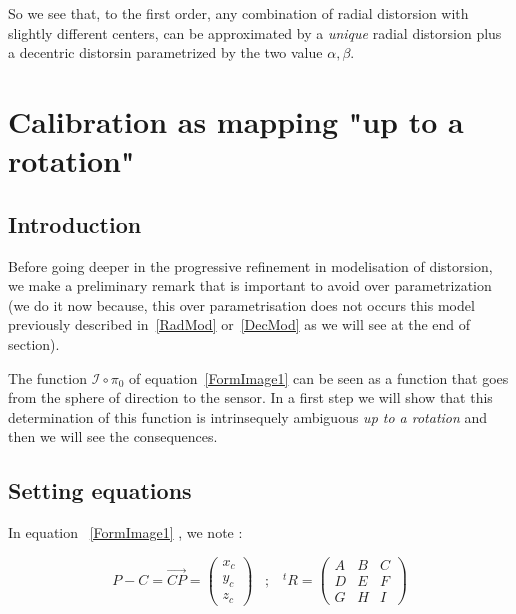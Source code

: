 So we see that, to the first order, any combination of radial distorsion with slightly different centers,
can be approximated by a \emph{unique} radial distorsion plus a decentric distorsin parametrized by the two value $\alpha,\beta$.


\section{Calibration as mapping "up to a rotation"}
\label{UpToARot}

\subsection{Introduction}

Before going deeper in the progressive refinement in modelisation of
distorsion, we  make a preliminary remark that is important
to avoid over parametrization (we do it now because, this over parametrisation
does not occurs this model previously described in~\ref{RadMod} or~\ref{DecMod} 
as we will see at the end of section).


The function $\mathcal{I} \circ \pi_0$  of equation~\ref{FormImage1} can be seen as a function that
goes from the sphere of direction to the sensor.  In a first
step we will show that this determination of this function is intrinsequely ambiguous
\emph{up to a rotation} and then we will see the consequences.


\subsection{Setting equations}

In equation ~\ref{FormImage1} , we note :

\begin{equation}
	P-C =  \overrightarrow{CP}  = \begin{pmatrix} x_c \\ y_c \\ z_c \end{pmatrix} 
\;\;\;  ;  \;\;\;
        ^t R =  \begin{pmatrix}  A & B & C \\ D & E & F \\ G & H & I \end{pmatrix} 
\end{equation}


